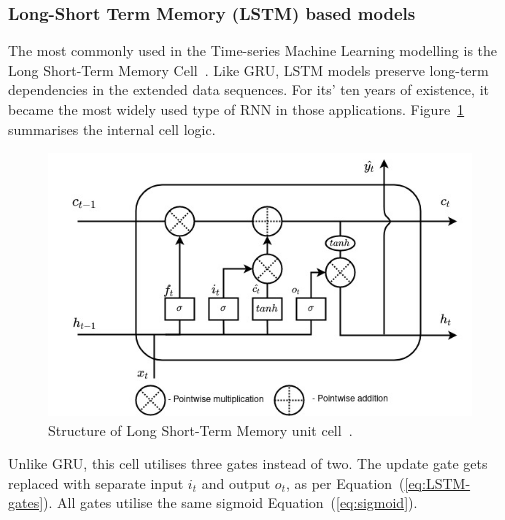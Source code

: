 %
\subsubsection{Long-Short Term Memory (LSTM) based models} \label{subsub:lstm}
The most commonly used in the Time-series Machine Learning modelling is the Long Short-Term Memory Cell~\cite{LSTM_Hochreiter1997}.
Like GRU, LSTM models preserve long-term dependencies in the extended data sequences.
For its' ten years of existence, it became the most widely used type of RNN in those applications.
\mbox{Figure~\ref{fig:LSTM-cell}} summarises the internal cell logic.
\begin{figure}[ht]%
    \centering
    \includegraphics[width=\linewidth]{II_Body/LSTM/images/LSTM.jpg}
    \caption{Structure of Long Short-Term Memory unit cell~\cite{Hochreiter:1997:LSM:1246443.1246450}.}
    \label{fig:LSTM-cell}
\end{figure}
Unlike GRU, this cell utilises three gates instead of two.
The update gate gets replaced with separate input $i_t$ and output $o_t$, as per \mbox{Equation~(\ref{eq:LSTM-gates})}.
All gates utilise the same sigmoid \mbox{Equation~(\ref{eq:sigmoid})}.
